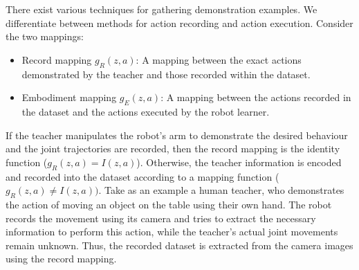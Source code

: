 There exist various techniques for gathering demonstration examples.
 We differentiate between methods for action recording and action execution.
 Consider the two mappings: \cite{argall2009survey}
\begin{itemize}
\item Record mapping $g_R(z,a)$: A mapping between the exact actions demonstrated by the teacher and those recorded within the dataset.
\item Embodiment mapping $g_E(z,a)$: A mapping between the actions recorded in the dataset and the actions executed by the robot learner.
\end{itemize}
If the teacher manipulates the robot's arm to demonstrate the desired behaviour and the joint trajectories are recorded, then the record mapping is the identity function ($g_R(z,a) = I(z,a)$).
 Otherwise, the teacher information is encoded and recorded into the dataset according to a mapping function ($g_R(z,a) \neq I(z,a))$.
 Take as an example a human teacher, who demonstrates the action of moving an object on the table using their own hand.
 The robot records the movement using its camera and tries to extract the necessary information to perform this action, while the teacher's actual joint movements remain unknown.
 Thus, the recorded dataset is extracted from the camera images using the record mapping.

